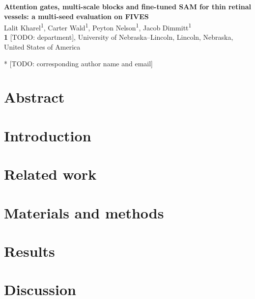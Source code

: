 \documentclass[10pt,letterpaper]{article}
\begin{document}
\vspace*{0.2in}

\begin{flushleft}
{\Large
\textbf{Attention gates, multi-scale blocks and fine-tuned SAM for thin retinal vessels: a multi-seed evaluation on FIVES}
}
\newline
\\
Lalit Kharel\textsuperscript{1},
Carter Wald\textsuperscript{1},
Peyton Nelson\textsuperscript{1},
Jacob Dimmitt\textsuperscript{1}
\\
\bigskip
\textbf{1} [TODO: department], University of Nebraska--Lincoln, Lincoln, Nebraska, United States of America
\\
\bigskip

* [TODO: corresponding author name and email]

\end{flushleft}

\section*{Abstract}


\clearpage
{}
\linenumbers

\section*{Introduction}


\section*{Related work}


\section*{Materials and methods}


\section*{Results}


\section*{Discussion}

\end{document}
